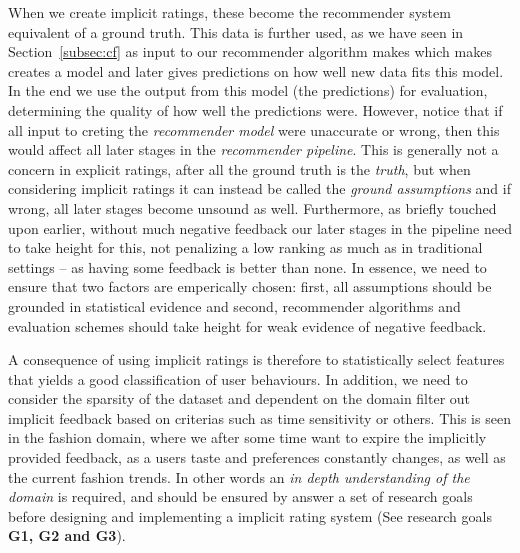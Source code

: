 When we create implicit ratings, these become the recommender system equivalent
of a ground truth. This data is further used, as we have seen in
Section~\ref{subsec:cf} as input to our recommender algorithm makes which makes
creates a model and later gives predictions on how well new data fits this
model. In the end we use the output from this model (the predictions) for
evaluation, determining the quality of how well the predictions were. However,
notice that if all input to creting the \textit{recommender model} were
unaccurate or wrong, then this would affect all later stages in the
\textit{recommender pipeline}. This is generally not a concern in explicit
ratings, after all the ground truth is the \textit{truth}, but when considering
implicit ratings it can instead be called the \textit{ground assumptions} and
if wrong, all later stages become unsound as well. Furthermore, as briefly
touched upon earlier, without much negative feedback our later stages in the
pipeline need to take height for this, not penalizing a low ranking as much as
in traditional settings -- as having some feedback is better than none. In
essence, we need to ensure that two factors are emperically chosen: first, all
assumptions should be grounded in statistical evidence and second, recommender
algorithms and evaluation schemes should take height for weak evidence of
negative feedback.

A consequence of using implicit ratings is therefore to statistically select
features that yields a good classification of user behaviours. In addition,
we need to consider the sparsity of the dataset and dependent on the domain
filter out implicit feedback based on criterias such as time sensitivity or
others. This is seen in the fashion domain, where we after some time want to
expire the implicitly provided feedback, as a users taste and preferences
constantly changes, as well as the current fashion trends. In other words an
\textit{in depth understanding of the domain} is required, and should be
ensured by answer a set of research goals before designing and implementing a
implicit rating system (See research goals \textbf{G1, G2 and G3}).
